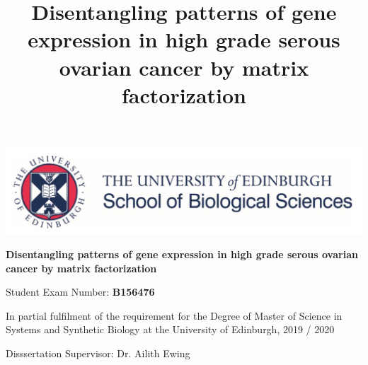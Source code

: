 \documentclass[tikz, 12pt,a4paper,oneside,fleqn]{article}
\title{Disentangling patterns of gene expression in high grade serous ovarian cancer by matrix factorization}
\author{}
\begin{document}
\begin{center}
\begin{center}
\includegraphics[scale=0.3]{images/UoE_SBO_logo.png}
\end{center}

\vspace{0.3in}

\begin{mdframed}
\begin{center}
\huge
\vspace{0.3in}
\bf
Disentangling patterns of gene expression in high grade serous ovarian cancer by matrix factorization
\vspace{0.2in}
\end{center}
\vspace{0.2in}
\end{mdframed}

\vspace{0.3in}

\begin{mdframed}
\begin{center}
\large
\vspace{0.2in}
Student Exam Number: \bf{B156476}
\vspace{0.2in}
\end{center}
\end{mdframed}

\vspace{0.3in}

\begin{mdframed}
\begin{center}
\large
\vspace{0.2in}
In partial fulfilment of the requirement for the Degree of
Master of Science in Systems and Synthetic Biology at the
University of Edinburgh,
2019 / 2020
\vspace{0.2in}
\end{center}
\end{mdframed}

\vspace{0.3in}

\begin{mdframed}
\begin{center}
\large
\vspace{0.2in}

Disssertation Supervisor:  Dr. Ailith Ewing
\vspace{0.2in}
\end{center}
\end{mdframed}
\end{center}
\end{document}
